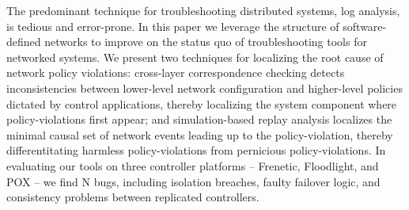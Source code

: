 The predominant technique for troubleshooting distributed systems,
log analysis, is tedious and error-prone. In this paper we leverage the
structure of software-defined networks to
improve on the status quo of troubleshooting tools for networked systems.
We present two techniques for localizing the root cause of network policy
violations: cross-layer correspondence checking detects inconsistencies between lower-level
network configuration and higher-level policies dictated by control
applications, thereby localizing the system component where policy-violations first
appear; and \newline{} simulation-based replay analysis localizes the minimal causal set of network events
leading up to the policy-violation, thereby differentitating harmless
policy-violations from pernicious policy-violations. In evaluating our tools on
three controller platforms -- Frenetic, Floodlight, and POX -- we find N bugs,
including isolation breaches,
faulty failover logic, and consistency problems between replicated
controllers.


